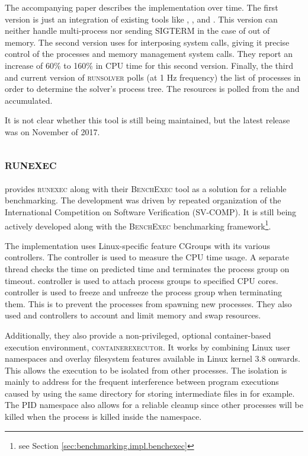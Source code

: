 The accompanying paper describes the implementation over time.
The first version is just an integration of existing tools like , , and .
This version can neither handle multi-process nor sending SIGTERM in the case of out of memory.
The second version uses  for interposing system calls, giving it precise control of the processes and memory management system calls.
They report an increase of 60\% to 160\% in CPU time for this second version.
Finally, the third and current version of \textsc{runsolver} polls (at 1 Hz frequency) the list of processes in order to determine the solver's process tree.
The resources is polled from the  and accumulated.

It is not clear whether this tool is still being maintained, but the latest release was on November of 2017.


\subsection{\textsc{runexec}}

\citet{beyerReliableBenchmarkingRequirements2019} provides \textsc{runexec} along with their \textsc{BenchExec} tool as a solution for a reliable benchmarking.
The development was driven by repeated organization of the International Competition on Software Verification (SV-COMP).
It is still being actively developed along with the \textsc{BenchExec} benchmarking framework\footnote{see Section \ref{sec:benchmarking.impl.benchexec}}.

The implementation uses Linux-specific feature CGroups with its various controllers.
The  controller is used to measure the CPU time usage.
A separate thread checks the time on predicted time and terminates the process group on timeout.
 controller is used to attach process groups to specified CPU cores.
 controller is used to freeze and unfreeze the process group when terminating them.
This is to prevent the processes from spawning new processes.
They also used  and  controllers to account and limit memory and swap resources.

Additionally, they also provide a non-privileged, optional container-based execution environment, \textsc{containerexecutor}.
It works by combining Linux user namespaces and overlay filesystem features available in Linux kernel 3.8 onwards.
This allows the execution to be isolated from other processes.
The isolation is mainly to address for the frequent interference between program executions caused by using the same directory for storing intermediate files in  for example.
The PID namespace also allows for a reliable cleanup since other processes will be killed when the  process is killed inside the namespace.


